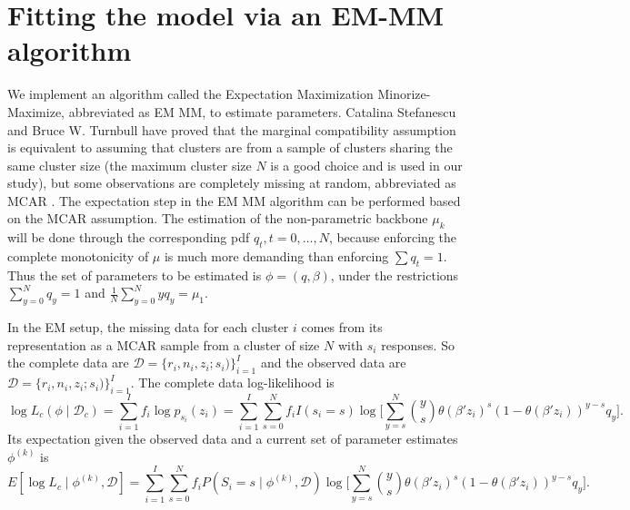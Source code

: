 \documentclass[reqno]{amsart}
\begin{document}
\section{Fitting the model via an EM-MM algorithm}

We implement an algorithm called the Expectation Maximization Minorize-Maximize, abbreviated as EM MM, to estimate parameters.  Catalina Stefanescu and Bruce W. Turnbull have proved that the marginal compatibility assumption is equivalent to assuming that clusters are from a sample of clusters sharing the same cluster size (the maximum cluster size $N$ is a good choice and is used in our study), but some observations are completely missing at random, abbreviated as MCAR \cite{stefanescu2003likelihood}. The expectation step in the EM MM algorithm can be performed based on the MCAR assumption. The estimation of the non-parametric backbone $\mu_k$ will be done through the corresponding pdf $q_t, t=0,\ldots,N$, because enforcing the complete monotonicity of $\mu$ is much more demanding than enforcing $\sum q_t=1$. Thus the set of parameters to be estimated is $\phi = (q, \beta)$, under the restrictions $\sum_{y=0}^N q_y=1$ and $\frac 1N \sum_{y=0}^{N}yq_y=\mu_1$.

In the EM setup, the missing data for each cluster $i$ comes from its representation as a MCAR sample from a cluster of size $N$ with $s_i$ responses. So the complete data are $\mathcal{D}=\{r_i, n_i, z_i; s_i)\}_{i=1}^I$ and the observed data are $\mathcal{D}=\{r_i, n_i, z_i; s_i)\}_{i=1}^I$. The complete data log-likelihood is
\begin{equation*}
  \log L_c (\phi \mid \mathcal{D}_c) = \sum_{i=1}^I f_i \log p_{s_i}(z_i) = \sum_{i=1}^I \sum_{s=0}^N f_i I(s_i=s) \log \Big[ \sum_{y=s}^N \binom{y}{s} {\theta(\beta'z_i)^s} {(1-\theta(\beta'z_i))}^{y-s} {q_y}\Big].
\end{equation*}
Its expectation given the observed data and a current set of parameter estimates $\phi^{(k)}$ is
\begin{equation*}
  E[\log L_c \mid \phi^{(k)}, \mathcal{D}]  = \sum_{i=1}^I \sum_{s=0}^N f_i P(S_i=s \mid \phi^{(k)}, \mathcal{D}) \log  \Big[\sum_{y=s}^N \binom{y}{s} {\theta(\beta'z_i)^s} {(1-\theta(\beta'z_i))}^{y-s} {q_y}\Big].
\end{equation*}
\end{document}
